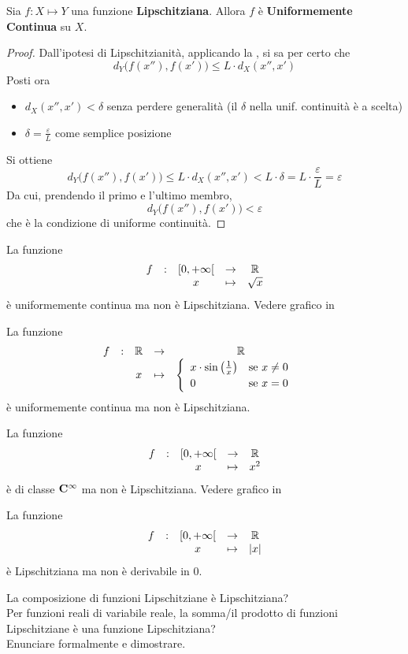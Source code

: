\begin{proposition}
	\label{prop:se_lips_allora_unif_cont}
	Sia $f: X \mapsto Y$ una funzione \textbf{Lipschitziana}. Allora $f$ è \textbf{Uniformemente Continua} su $X$.
	\begin{proof}
		Dall'ipotesi di Lipschitzianità, applicando la , si sa per certo che
		\[d_Y\bigl(f(x''),f(x')\bigr) \leq L \cdot d_X(x'',x')\]
		Posti ora
		\begin{itemize}
			\item $d_X(x'',x') < \delta$ senza perdere generalità (il $\delta$ nella unif. continuità è a scelta)
			\item $\delta = \frac{\varepsilon}{L}$ come semplice posizione
		\end{itemize}
		Si ottiene
		\[d_Y\bigl(f(x''),f(x')\bigr) \leq L \cdot d_X(x'',x') < L \cdot \delta = L \cdot \frac{\varepsilon}{L} = \varepsilon\]
		Da cui, prendendo il primo e l'ultimo membro,
		\[d_Y\bigl(f(x''),f(x')\bigr) < \varepsilon\]
		che è la condizione di uniforme continuità.
	\end{proof}
\end{proposition}
\begin{example}
	La funzione
	\[\begin{array}{ccccc} {f} & : & {\left[0,+\infty\right[} & \to & {\mathbb{R}} \\ & & {x} & \mapsto & {\sqrt{x}} \\ \end{array}\]
	è uniformemente continua ma non è Lipschitziana. Vedere grafico in 
\end{example}
\begin{example}
	La funzione
	\[\begin{array}{ccccc} {f} & : & {\mathbb{R}} & \to & {\mathbb{R}} \\ & & {x} & \mapsto & {\begin{cases}
		\begin{array}{ll}
			x \cdot \sin \left(\frac{1}{x}\right) & \text{se } x \neq 0\\
			0 & \text{se } x = 0\\
		\end{array}
	\end{cases}} \\ \end{array}\]
	è uniformemente continua ma non è Lipschitziana.
\end{example}
\begin{example}
	La funzione
	\[\begin{array}{ccccc} {f} & : & {\left[0,+\infty\right[} & \to & {\mathbb{R}} \\ & & {x} & \mapsto & {x^2} \\ \end{array}\]
	è di classe $\mathbf{C^{\infty}}$ ma non è Lipschitziana. Vedere grafico in 
\end{example}
\begin{example}
	La funzione
	\[\begin{array}{ccccc} {f} & : & {\left[0,+\infty\right[} & \to & {\mathbb{R}} \\ & & {x} & \mapsto & {\left|x\right|} \\ \end{array}\]
	è Lipschitziana ma non è derivabile in $0$.
\end{example}
\begin{exercise}
	La composizione di funzioni Lipschitziane è Lipschitziana?\\
	Per funzioni reali di variabile reale, la somma/il prodotto di funzioni Lipschitziane è una funzione Lipschitziana?\\
	Enunciare formalmente e dimostrare.
\end{exercise}

